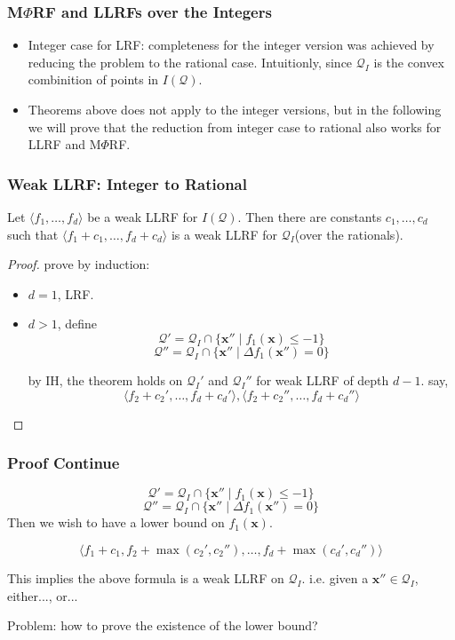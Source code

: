 \documentclass[11pt]{beamer}
\begin{document}
\begin{frame}\frametitle{M$\Phi$RF and LLRFs over the Integers}

\begin{itemize}
\item Integer case for LRF: completeness for the integer version was achieved by reducing the problem to the rational case. Intuitionly, since $\mathcal{Q}_I$ is the convex combinition of points in $I(\mathcal{Q})$.

\item Theorems above does not apply to the integer versions, but in the following we will prove that the reduction from integer case to rational also works for LLRF and M$\Phi$RF.
\end{itemize}


\end{frame}


\begin{frame}\frametitle{Weak LLRF: Integer to Rational}
\begin{theorem}[4]

Let $\langle f_1, \ldots, f_d\rangle$ be a weak LLRF for $I(\mathcal{Q})$. Then there are constants $c_1, \ldots, c_d$ such that $\langle f_1 + c_1, \ldots, f_d + c_d\rangle$ is a weak LLRF for $\mathcal{Q}_I$(over the rationals).

\end{theorem}


\begin{proof}
prove by induction:

\begin{itemize}
\item $d = 1$, LRF.
\item $d > 1$, define 
\[\mathcal{Q}' = \mathcal{Q}_I\cap \{\textbf{x}''\mid f_1(\textbf{x}) \le -1\}\]
\[\mathcal{Q}'' = \mathcal{Q}_I \cap \{\textbf{x}''\mid \Delta f_1(\textbf{x}'') = 0\}\]

by IH, the theorem holds on $\mathcal{Q}_I'$ and $\mathcal{Q}_I''$ for weak LLRF of depth $d - 1$. say,
\[\langle f_2 + c_2', \ldots, f_d + c_d'\rangle, \langle f_2 + c_2'', \ldots, f_d + c_d''\rangle\]
\end{itemize}

\end{proof}
\end{frame}


\begin{frame}\frametitle{Proof Continue}


\[\mathcal{Q}' = \mathcal{Q}_I\cap \{\textbf{x}''\mid f_1(\textbf{x}) \le -1\}\]
\[\mathcal{Q}'' = \mathcal{Q}_I \cap \{\textbf{x}''\mid \Delta f_1(\textbf{x}'') = 0\}\]
Then we wish to have a lower bound on $f_1(\textbf{x})$.

\[\langle f_1 + c_1, f_2 + \max(c_2', c_2''), \ldots, f_d + \max(c_d', c_d'')\rangle\]

This implies the above formula is a weak LLRF on $\mathcal{Q}_I$. i.e. given a $\textbf{x}''\in \mathcal{Q}_I$, either..., or...

Problem: how to prove the existence of the lower bound?

\end{frame}
\end{document}
